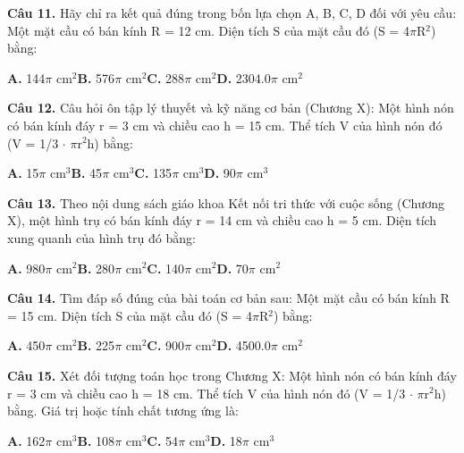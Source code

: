 \documentclass[11pt,a4paper]{article}
\begin{document}
\textbf{\color{primary} Câu 11.} Hãy chỉ ra kết quả đúng trong bốn lựa chọn A, B, C, D đối với yêu cầu: Một mặt cầu có bán kính R = 12 cm. Diện tích S của mặt cầu đó (S = 4$\pi$R$^2$) bằng:\par
\hspace*{1.5em}\textbf{A.} 144$\pi$ cm$^2$\quad\quad \textbf{B.} 576$\pi$ cm$^2$\quad\quad \textbf{C.} 288$\pi$ cm$^2$\quad\quad \textbf{D.} 2304.0$\pi$ cm$^2$\par\vspace{2pt}
\textbf{\color{primary} Câu 12.} Câu hỏi ôn tập lý thuyết và kỹ năng cơ bản (Chương X): Một hình nón có bán kính đáy r = 3 cm và chiều cao h = 15 cm. Thể tích V của hình nón đó (V = 1/3 $\cdot$ $\pi$r$^2$h) bằng:\par
\hspace*{1.5em}\textbf{A.} 15$\pi$ cm$^3$\quad\quad \textbf{B.} 45$\pi$ cm$^3$\quad\quad \textbf{C.} 135$\pi$ cm$^3$\quad\quad \textbf{D.} 90$\pi$ cm$^3$\par\vspace{2pt}
\textbf{\color{primary} Câu 13.} Theo nội dung sách giáo khoa Kết nối tri thức với cuộc sống (Chương X), một hình trụ có bán kính đáy r = 14 cm và chiều cao h = 5 cm. Diện tích xung quanh của hình trụ đó bằng:\par
\hspace*{1.5em}\textbf{A.} 980$\pi$ cm$^2$\quad\quad \textbf{B.} 280$\pi$ cm$^2$\quad\quad \textbf{C.} 140$\pi$ cm$^2$\quad\quad \textbf{D.} 70$\pi$ cm$^2$\par\vspace{2pt}
\textbf{\color{primary} Câu 14.} Tìm đáp số đúng của bài toán cơ bản sau: Một mặt cầu có bán kính R = 15 cm. Diện tích S của mặt cầu đó (S = 4$\pi$R$^2$) bằng:\par
\hspace*{1.5em}\textbf{A.} 450$\pi$ cm$^2$\quad\quad \textbf{B.} 225$\pi$ cm$^2$\quad\quad \textbf{C.} 900$\pi$ cm$^2$\quad\quad \textbf{D.} 4500.0$\pi$ cm$^2$\par\vspace{2pt}
\textbf{\color{primary} Câu 15.} Xét đối tượng toán học trong Chương X: Một hình nón có bán kính đáy r = 3 cm và chiều cao h = 18 cm. Thể tích V của hình nón đó (V = 1/3 $\cdot$ $\pi$r$^2$h) bằng. Giá trị hoặc tính chất tương ứng là:\par
\hspace*{1.5em}\textbf{A.} 162$\pi$ cm$^3$\quad\quad \textbf{B.} 108$\pi$ cm$^3$\quad\quad \textbf{C.} 54$\pi$ cm$^3$\quad\quad \textbf{D.} 18$\pi$ cm$^3$\par\vspace{2pt}
\end{document}
